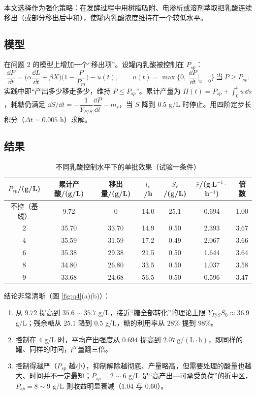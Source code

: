 本文选择作为强化策略：在发酵过程中用树脂吸附、电渗析或溶剂萃取把乳酸连续移出（或部分移出后中和），使罐内乳酸浓度维持在一个较低水平。

\subsection{模型}
在问题 2 的模型上增加一个“移出项”。设罐内乳酸被控制在 $P_{sp}$：
\begin{equation}
\frac{\dd P}{\dd t}=\Big(\alpha\frac{\dd L}{\dd t}+\beta X\Big)\Big(1-\frac{P}{P_m}\Big)-u(t),\qquad
u(t)=\max\Big\{0,\ \frac{\dd P}{\dd t}\Big|_{u=0}\Big\}
\ \text{当}\ P\ge P_{sp}.
\label{eq:ispr}
\end{equation}
实践中即“产出多少移走多少，维持 $P\le P_{sp}$”。累计产量为 $\Pi(t)=P_{sp}+\int_0^t u\,\dd s$，耗糖仍满足 $\dd S/\dd t=-\dfrac{1}{Y_{P/S}}\dfrac{\dd P}{\dd t}-m_s$，当 $S$ 降到 $0.5$ g/L 时停止。用四阶定步长积分（$\Delta t=0.005$ h）求解。

\subsection{结果}
\begin{table}[H]
\centering
\caption{不同乳酸控制水平下的单批效果（试验一条件）}
\label{tab:ispr}
\small
\setlength{\tabcolsep}{5pt}
\begin{tabular}{ccccccc}
\toprule
$P_{sp}$/(g/L) & 累计产酸/(g/L) & 移出量/(g/L) & $t_e$/h & $S_r$/(g/L) & $\bar r$/(g$\cdot$L$^{-1}\cdot$h$^{-1}$) & 倍数 \\
\midrule
不控（基线） & 9.72 & 0 & 14.0 & 25.1 & 0.694 & 1.00 \\
2 & 35.70 & 33.70 & 14.9 & 0.50 & 2.393 & 3.67 \\
4 & 35.59 & 31.59 & 17.2 & 0.49 & 2.067 & 3.66 \\
6 & 35.38 & 29.38 & 21.5 & 0.50 & 1.644 & 3.64 \\
8 & 34.80 & 26.80 & 33.5 & 0.50 & 1.037 & 3.58 \\
9 & 33.68 & 24.68 & 56.5 & 0.50 & 0.596 & 3.47 \\
\bottomrule
\end{tabular}
\end{table}

结论非常清晰（图 \ref{fig:q4}(a)(b)）：

\begin{enumerate}[leftmargin=2.2em,itemsep=0.10em]
\item {}从 $9.72$ 提高到 $35.6\sim35.7$ g/L，接近“糖全部转化”的理论上限 $Y_{P/S}S_0\approx36.9$ g/L；残余糖从 $25.1$ 降到 $0.5$ g/L，糖的利用率从 $28\%$ 提到 $98\%$。
\item {}控制在 $4$ g/L 时，平均产出强度从 $0.694$ 提高到 $2.07\ \mathrm{g/(L\cdot h)}$，即同样的罐、同样的时间，产量翻三倍。
\item {}控制得越严（$P_{sp}$ 越小），抑制解除越彻底、产量略高，但需要处理的酸量也越大、时间并不一定最短；$P_{sp}=2\sim6$ g/L 是“高产出—可承受负荷”的折中区，$P_{sp}=8\sim9$ g/L 则收益明显衰减（$1.04$ 与 $0.60$）。
\end{enumerate}

